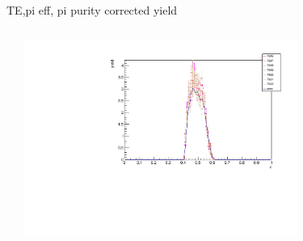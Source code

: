 \begin{frame}{TE,pi eff, pi purity corrected yield}
\begin{columns}
\begin{column}[T]{0.5\textwidth}
\end{column}
\begin{column}[T]{0.5\textwidth}
\includegraphics[width = 0.7\textwidth]{results/yield/check/yieldcheck_440_pos.pdf}
\end{column}
\end{columns}
\end{frame}
